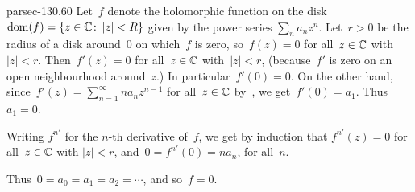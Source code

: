 \documentclass[b5page]{book}
\begin{document}
\begin{solution}{parsec-130.60}
Let~$f$ denote the holomorphic
    function on the disk $\operatorname{dom}(f)=\{z\in \mathbb{C}\colon \left|z\right|<R\}$
    given by the power series $\sum_n a_n z^n$.
Let~$r>0$ be the radius of a disk around~$0$ on  which~$f$ is zero,
    so~$f(z)=0$ for all~$z\in \mathbb{C}$ with $\left|z\right|<r$.
Then~$f'(z)=0$ for all~$z\in \mathbb{C}$ with~$\left|z\right|<r$,
    (because~$f'$ is zero on an open neighbourhood around~$z$.)
In particular~$f'(0)=0$.
On the other hand,
    since~$f'(z)=\sum_{n=1}^\infty
    n a_{n} z^{n-1}$ for all~$z\in \mathbb{C}$
by~,
    we get~$f'(0)=a_1$.
    Thus~$a_1=0$.

Writing $f^{n\prime }$ for the $n$-th derivative of~$f$,
we get by induction 
that $f^{n \prime }(z)=0$ for all~$z\in \mathbb{C}$
    with $\left|z\right|< r$,
    and~$0=f^{n\prime }(0)=na_n$, for all~$n$.

    Thus~$0=a_0=a_1=a_2=\dotsb$,
    and so~$f=0$.
\end{solution}
\end{document}
